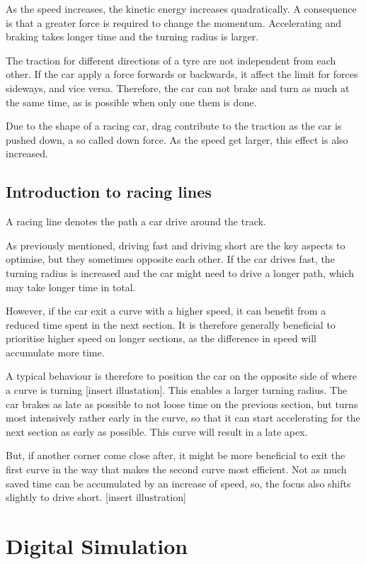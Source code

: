 As the speed increases, the kinetic energy increases quadratically. A consequence is that a greater force is required to change the momentum. Accelerating and braking takes longer time and the turning radius is larger.

The traction for different directions of a tyre are not independent from each other. If the car apply a force forwards or backwards, it affect the limit for forces sideways, and vice versa. Therefore, the car can not brake and turn as much at the same time, as is possible when only one them is done.

Due to the shape of a racing car, drag contribute to the traction as the car is pushed down, a so called down force. As the speed get larger, this effect is also increased.


\subsection{Introduction to racing lines}
A racing line denotes the path a car drive around the track.

As previously mentioned, driving fast and driving short are the key aspects to optimise, but they sometimes opposite each other. If the car drives fast, the turning radius is increased and the car might need to drive a longer path, which may take longer time in total. 

However, if the car exit a curve with a higher speed, it can benefit from a reduced time spent in the next section. It is therefore generally beneficial to prioritise higher speed on longer sections, as the difference in speed will accumulate more time.

A typical behaviour is therefore to position the car on the opposite side of where a curve is turning [insert illustation]. This enables a larger turning radius. The car brakes as late as possible to not loose time on the previous section, but turns most intensively rather early in the curve, so that it can start accelerating for the next section as early as possible. This curve will result in a late apex.

But, if another corner come close after, it might be more beneficial to exit the first curve in the way that makes the second curve most efficient. Not as much saved time can be accumulated by an increase of speed, so, the focus also shifts slightly to drive short. [insert illustration]

\section{Digital Simulation}

